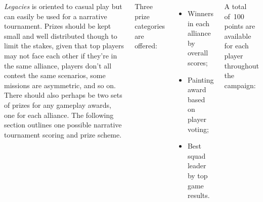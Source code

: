 \begin{columns}
\vfill
\centerline{}
\clearpage


\emph{Legacies} is oriented to casual play but can easily be used for
a narrative tournament.  Prizes should be kept small and well
distributed though to limit the stakes, given that top players may not
face each other if they're in the same alliance, players don't all
contest the same scenarios, some missions are asymmetric, and so on.
There should also perhaps be two sets of prizes for any gameplay
awards, one for each alliance.  The following section outlines one
possible narrative tournament scoring and prize scheme.

 Three prize categories are offered:

\begin{itemize}\shortlist
\item Winners in each alliance by overall scores;
\item Painting award based on player voting;
\item Best squad leader by top game results.
\end{itemize}

 A total of~100 points are
available for each player throughout the campaign:


\end{columns}
